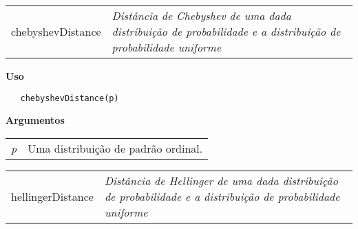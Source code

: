 \hrulefill   

\begin{table}[!ht]
\begin{center}
\begin{tabularx}{\textwidth}{ X X}
\hspace{0.5cm} chebyshevDistance & \textit{Distância de Chebyshev de uma dada distribuição de probabilidade e a distribuição de probabilidade uniforme}\\
\end{tabularx}
\end{center}
\end{table} 

\vspace{-0.5cm}

\hrulefill  

\vspace{0.5cm}

\textbf{Uso}

\begin{lstlisting}
   chebyshevDistance(p)
\end{lstlisting}

\vspace{0.5cm}

\textbf{Argumentos}

\begin{table}[!ht]
\begin{center}
\begin{tabularx}{\textwidth}{X X}
\hspace{0.5cm} \textit{p} & Uma distribuição de padrão ordinal.\\
\end{tabularx}
\end{center}
\end{table} 

\newpage


\hrulefill   

\begin{table}[!ht]
\begin{center}
\begin{tabularx}{\textwidth}{ X X}
\hspace{0.5cm} hellingerDistance & \textit{Distância  de Hellinger de uma dada distribuição de probabilidade e a distribuição de probabilidade uniforme}\\
\end{tabularx}
\end{center}
\end{table} 


